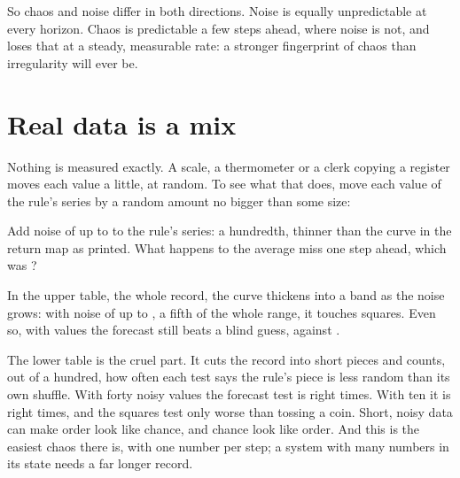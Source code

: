 So chaos and noise differ in both directions. Noise is equally unpredictable
at every horizon. Chaos is predictable a few steps ahead, where noise is not,
and loses that at a steady, measurable rate: a stronger fingerprint of chaos
than irregularity will ever be.

\section{Real data is a mix}
\label{sec:ch15-noisy}

\noindent
Nothing is measured exactly. A scale, a thermometer or a clerk copying a
register moves each value a little, at random. To see what that does, move
each value of the rule's series by a random amount no bigger than some size:


\begin{think}
Add noise of up to  to the rule's series: a hundredth,
thinner than the curve in the return map as printed. What happens to the
average miss one step ahead, which was ?
\end{think}



\noindent
In the upper table, the whole record, the curve thickens into a band as the
noise grows: with noise of up to , a fifth of the whole
range, it touches  squares. Even so, with
 values the forecast still beats a blind guess,
 against .

The lower table is the cruel part. It cuts the record into short pieces and
counts, out of a hundred, how often each test says the rule's piece is less
random than its own shuffle. With forty noisy values the forecast test is
right  times. With ten it is right
 times, and the squares test only 
\dash{} worse than tossing a coin. Short, noisy data can make order look like
chance, and chance look like order.
And this is the easiest chaos there is, with one number per step; a system
with many numbers in its state needs a far longer record.

